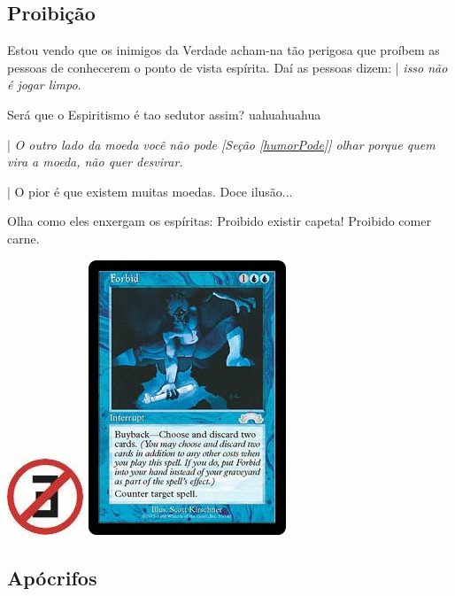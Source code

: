 \documentclass[12pt,a4paper]{article}
\begin{document}
		\subsection{Proibi\c{c}\~ao}
			\begin{flushright}
			\end{flushright}

			Estou vendo que os inimigos da Verdade\cite{verdade} acham-na t\~ao perigosa que pro\'ibem as pessoas de conhecerem o ponto de vista esp\'irita. Da\'i as pessoas dizem: | \emph{isso n\~ao \'e jogar limpo}.

			Ser\'a que o Espiritismo \'e tao sedutor assim? uahuahuahua

			| \emph{O outro lado da moeda voc\^e n\~ao pode [Se\c{c}\~ao \ref{humorPode}] olhar porque quem vira a moeda, n\~ao quer desvirar.}

			| O pior \'e que existem muitas moedas. Doce ilus\~ao...

Olha como eles enxergam os esp\'iritas: Proibido existir capeta! Proibido comer carne.

			\begin{center}
			\includegraphics{proibido} \includegraphics{forbid}
			\end{center}

		\subsection{Ap\'ocrifos}
			\begin{flushright}
			\end{flushright}
\end{document}
